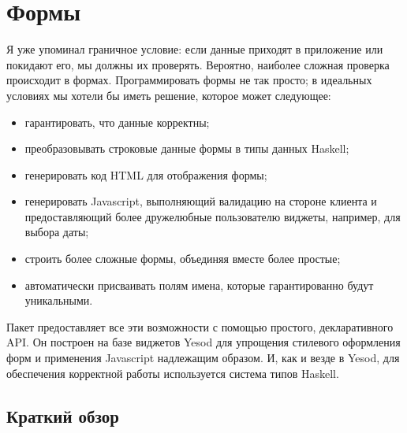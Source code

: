 \chapter{Формы}\label{chap:forms}
Я уже упоминал граничное условие: если данные приходят в приложение или
покидают его, мы должны их проверять. Вероятно, наиболее сложная проверка
происходит в формах.  Программировать формы не так просто; в идеальных
условиях мы хотели бы иметь решение, которое может следующее:

\begin{itemize}
    \item гарантировать, что данные корректны;

    \item преобразовывать строковые данные формы в типы данных Haskell;

    \item генерировать код HTML для отображения формы;

    \item генерировать Javascript, выполняющий валидацию на стороне клиента и
        предоставляющий более дружелюбные пользователю виджеты, например, для
        выбора даты;

    \item строить более сложные формы, объединяя вместе более простые;

    \item автоматически присваивать полям имена, которые гарантированно будут
        уникальными.
\end{itemize}

Пакет 
предоставляет все эти возможности с помощью простого,
декларативного API. Он построен на базе виджетов Yesod для упрощения стилевого
оформления форм и применения Javascript надлежащим образом. И, как и везде в
Yesod, для обеспечения корректной работы используется система типов Haskell.

\section{Краткий обзор}

